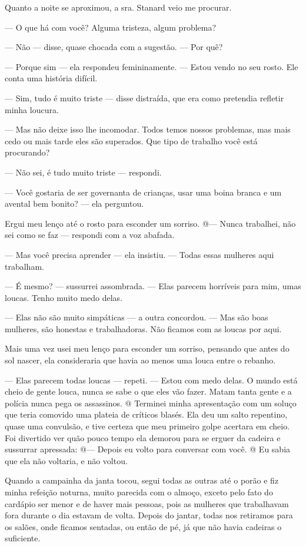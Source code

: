 Quanto a noite se aproximou, a sra. Stanard veio me procurar.

--- O que há com você? Alguma tristeza, algum problema?

--- Não --- disse, quase chocada com a sugestão. --- Por quê?

--- Porque sim --- ela respondeu femininamente. --- Estou vendo no seu
rosto. Ele conta uma história difícil.

--- Sim, tudo é muito triste --- disse distraída, que era como pretendia
refletir minha loucura.

--- Mas não deixe isso lhe incomodar. Todos temos nossos problemas, mas
mais cedo ou mais tarde eles são superados. Que tipo de trabalho você
está procurando?

--- Não sei, é tudo muito triste --- respondi.

--- Você gostaria de ser governanta de crianças, usar uma boina branca e
um avental bem bonito? --- ela perguntou.

Ergui meu lenço até o rosto para esconder um sorriso. @--- Nunca
trabalhei, não sei como se faz --- respondi com a voz abafada.

--- Mas você precisa aprender --- ela insistiu. --- Todas essas mulheres
aqui trabalham.

--- É mesmo? --- sussurrei assombrada. --- Elas parecem horríveis para
mim, umas loucas. Tenho muito medo delas.

--- Elas não são muito simpáticas --- a outra concordou. --- Mas são
boas mulheres, são honestas e trabalhadoras. Não ficamos com as loucas
por aqui.

Mais uma vez usei meu lenço para esconder um sorriso, pensando que antes
do sol nascer, ela consideraria que havia ao menos uma louca entre o
rebanho.

--- Elas parecem todas loucas --- repeti. --- Estou com medo delas. O
mundo está cheio de gente louca, nunca se sabe o que eles vão fazer.
Matam tanta gente e a polícia nunca pega os assassinos. @ Terminei minha
apresentação com um soluço que teria comovido uma plateia de críticos
blasés. Ela deu um salto repentino, quase uma convulsão, e tive certeza
que meu primeiro golpe acertara em cheio. Foi divertido ver quão pouco
tempo ela demorou para se erguer da cadeira e sussurrar apressada: @---
Depois eu volto para conversar com você. @ Eu sabia que ela não
voltaria, e não voltou.

Quando a campainha da janta tocou, segui todas as outras até o porão e
fiz minha refeição noturna, muito parecida com o almoço, exceto pelo
fato do cardápio ser menor e de haver mais pessoas, pois as mulheres que
trabalhavam fora durante o dia estavam de volta. Depois do jantar, todas
nos retiramos para os salões, onde ficamos sentadas, ou então de pé, já
que não havia cadeiras o suficiente.

